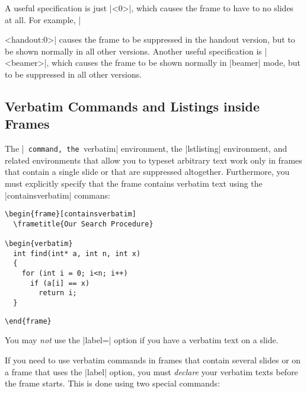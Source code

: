 A useful specification is just |<0>|, which causes the frame to
have to no slides at all. For example, |\begin{frame}<handout:0>| causes
the frame to be suppressed in the handout version, but to be shown
normally in all other versions. Another useful specification is
|<beamer>|, which causes the frame to be shown normally in |beamer|
mode, but to be suppressed in all other versions.


\subsection{Verbatim Commands and Listings inside Frames}
\label{section-verbatim}

The |\verb| command, the |verbatim| environment, the
|lstlisting| environment, and related environments that allow
you to typeset arbitrary text work only in
frames that contain a single slide or that are suppressed
altogether. Furthermore, you must explicitly specify that the frame
contains verbatim text using the |containsverbatim| commans:
\begin{verbatim}
\begin{frame}[containsverbatim]
  \frametitle{Our Search Procedure}

\begin{verbatim}
  int find(int* a, int n, int x)
  {
    for (int i = 0; i<n; i++)
      if (a[i] == x)
        return i;
  }
\end{verbatim}
\unskip{\MacroFont|\end{verbatim}|}
\begin{verbatim}
\end{frame}
\end{verbatim}

You may \emph{not} use the |label=| option if you
have a verbatim text on a slide.

If you need to use verbatim commands in frames that contain several
slides or on a frame that uses the |label| option, you must
\emph{declare} your verbatim texts before the frame starts. This is
done using two special commands:


\end{frame}
